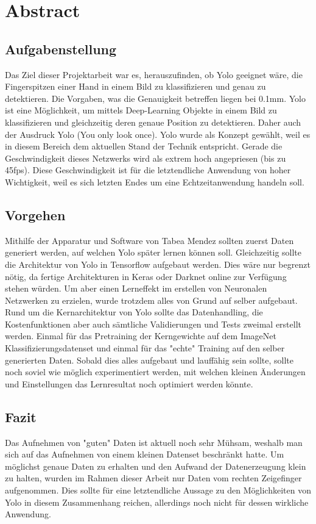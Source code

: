 \newpage
\section{Abstract}
\subsection{Aufgabenstellung}
Das Ziel dieser Projektarbeit war es, herauszufinden, ob Yolo geeignet wäre, die Fingerspitzen einer Hand in einem Bild zu klassifizieren und genau zu detektieren. 
Die Vorgaben, was die Genauigkeit betreffen liegen bei 0.1mm.
Yolo ist eine Möglichkeit, um mittels Deep-Learning Objekte in einem Bild zu klassifizieren und gleichzeitig deren genaue Position zu detektieren. 
Daher auch der Ausdruck Yolo (You only look once).
Yolo wurde als Konzept gewählt, weil es in diesem Bereich dem aktuellen Stand der Technik entspricht. 
Gerade die Geschwindigkeit dieses Netzwerks wird als extrem hoch angepriesen (bis zu 45fps).
Diese Geschwindigkeit ist für die letztendliche Anwendung von hoher Wichtigkeit, weil es sich letzten Endes um eine Echtzeitanwendung handeln soll. 

\subsection{Vorgehen}
Mithilfe der Apparatur und Software von Tabea Mendez sollten zuerst Daten generiert werden, auf welchen Yolo später lernen können soll. 
Gleichzeitig sollte die Architektur von Yolo in Tensorflow aufgebaut werden. 
Dies wäre nur begrenzt nötig, da fertige Architekturen in Keras oder Darknet online zur Verfügung stehen würden.
Um aber einen Lerneffekt im erstellen von Neuronalen Netzwerken zu erzielen, wurde trotzdem alles von Grund auf selber aufgebaut.
Rund um die Kernarchitektur von Yolo sollte das Datenhandling, die Kostenfunktionen aber auch sämtliche Validierungen und Tests zweimal erstellt werden. 
Einmal für das Pretraining der Kerngewichte auf dem ImageNet Klassifizierungsdatenset und einmal für das "echte" Training auf den selber generierten Daten. 
Sobald dies alles aufgebaut und lauffähig sein sollte, sollte noch soviel wie möglich experimentiert werden, mit welchen kleinen Änderungen und Einstellungen das Lernresultat noch optimiert werden könnte.   

\subsection{Fazit}
Das Aufnehmen von "guten" Daten ist aktuell noch sehr Mühsam, weshalb man sich auf das Aufnehmen von einem kleinen Datenset beschränkt hatte. 
Um möglichst genaue Daten zu erhalten und den Aufwand der Datenerzeugung klein zu halten, wurden im Rahmen dieser Arbeit nur Daten vom rechten Zeigefinger aufgenommen. 
Dies sollte für eine letztendliche Aussage zu den Möglichkeiten von Yolo in diesem Zusammenhang reichen, allerdings noch nicht für dessen wirkliche Anwendung. 

